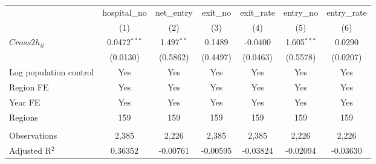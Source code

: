 \begingroup
\centering
\begin{tabular}{lcccccc}
   \toprule
                          & hospital\_no   & net\_entry   & exit\_no  & exit\_rate  & entry\_no     & entry\_rate \\    
                          & (1)            & (2)          & (3)       & (4)         & (5)           & (6)\\  
   \midrule 
   $Cross2h_{it}$         & 0.0472$^{***}$ & 1.497$^{**}$ & 0.1489    & -0.0400     & 1.605$^{***}$ & 0.0290\\   
                          & (0.0130)       & (0.5862)     & (0.4497)  & (0.0463)    & (0.5578)      & (0.0207)\\   
   Log population control & Yes            & Yes          & Yes       & Yes         & Yes           & Yes\\  
   Region FE              & Yes            & Yes          & Yes       & Yes         & Yes           & Yes\\  
   Year FE                & Yes            & Yes          & Yes       & Yes         & Yes           & Yes\\  
   Regions                & 159            & 159          & 159       & 159         & 159           & 159\\  
    \\
   Observations           & 2,385          & 2,226        & 2,385     & 2,385       & 2,226         & 2,226\\  
   Adjusted R$^2$         & 0.36352        & -0.00761     & -0.00595  & -0.03824    & -0.02094      & -0.03630\\  
   \bottomrule
\end{tabular}
\par\endgroup
